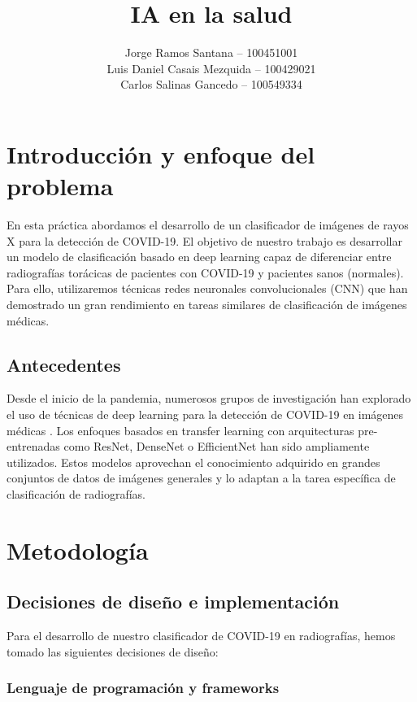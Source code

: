 \documentclass[es]{uc3mreport}
\author{
  Jorge Ramos Santana -- 100451001\\
  Luis Daniel Casais Mezquida -- 100429021\\
  Carlos Salinas Gancedo -- 100549334
}
\title{IA en la salud}
\begin{document}
  \makecover[old]

  \tableofcontents
  \listoffigures

  \begin{report}

    \section{Introducción y enfoque del problema}
    
    En esta práctica abordamos el desarrollo de un clasificador de imágenes de rayos X para la detección de COVID-19. El objetivo de nuestro trabajo es desarrollar un modelo de clasificación basado en deep learning capaz de diferenciar entre radiografías torácicas de pacientes con COVID-19 y pacientes sanos (normales). Para ello, utilizaremos técnicas redes neuronales convolucionales (CNN) que han demostrado un gran rendimiento en tareas similares de clasificación de imágenes médicas.
    
    \subsection{Antecedentes}
    
    Desde el inicio de la pandemia, numerosos grupos de investigación han explorado el uso de técnicas de deep learning para la detección de COVID-19 en imágenes médicas \cite{Tartaglione_2020} \cite{lara2025diagnosingcovid19severitychest}. Los enfoques basados en transfer learning con arquitecturas pre-entrenadas como ResNet, DenseNet o EfficientNet han sido ampliamente utilizados. Estos modelos aprovechan el conocimiento adquirido en grandes conjuntos de datos de imágenes generales y lo adaptan a la tarea específica de clasificación de radiografías.
    
    \section{Metodología}
    
    \subsection{Decisiones de diseño e implementación}
    
    Para el desarrollo de nuestro clasificador de COVID-19 en radiografías, hemos tomado las siguientes decisiones de diseño:
    
    \subsubsection{Lenguaje de programación y frameworks}
    

\end{report}
\end{document}
